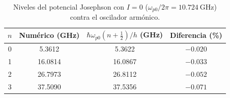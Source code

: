 \begin{table}[H]
    \centering
    \caption{Niveles del potencial Josephson con $I=0$ ($\omega_{p0}/2\pi=10.724\ \mathrm{GHz}$) contra el oscilador armónico.}
    \label{tab:validacionI0}
    \begin{tabular}{cccc}
        \hline
        $n$ & Numérico (GHz) & $\hbar\omega_{p0}(n+\frac12)/h$ (GHz) & Diferencia (\%) \\
        \hline
        0 & 5.3612 & 5.3622 & $-0.020$ \\
        1 & 16.0814 & 16.0867 & $-0.033$ \\
        2 & 26.7973 & 26.8112 & $-0.052$ \\
        3 & 37.5090 & 37.5356 & $-0.071$ \\
        \hline
    \end{tabular}
\end{table}
